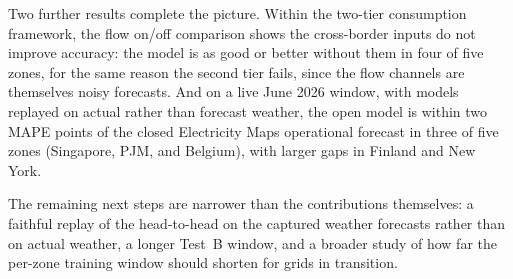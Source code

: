 \documentclass[sigconf,nonacm,a4paper]{acmart}  %
\begin{document}
Two further results complete the picture. Within the two-tier consumption framework, the flow on/off comparison shows the
cross-border inputs do not improve accuracy: the model is as good or better without
them in four of five zones, for the same reason the second tier fails, since the
flow channels are themselves noisy forecasts. And on a live June 2026 window, with models replayed on actual rather than forecast
weather, the open model is within two MAPE points of the closed Electricity Maps
operational forecast in three of five zones (Singapore, PJM, and Belgium), with larger gaps in Finland and New York.

The remaining next steps are narrower than the contributions themselves: a faithful
replay of the head-to-head on the captured weather forecasts rather than on actual
weather, a longer Test~B window, and a broader study of how far the per-zone training
window should shorten for grids in transition.



\end{document}
